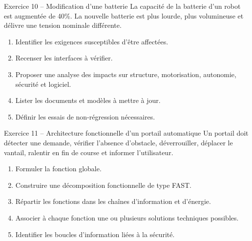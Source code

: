 \begin{TLExercise}{Exercice 10 -- Modification d'une batterie}
La capacité de la batterie d'un robot est augmentée de 40\%. La nouvelle batterie est plus lourde, plus volumineuse et délivre une tension nominale différente.
\begin{enumerate}
  \item Identifier les exigences susceptibles d'être affectées.
  \item Recenser les interfaces à vérifier.
  \item Proposer une analyse des impacts sur structure, motorisation, autonomie, sécurité et logiciel.
  \item Lister les documents et modèles à mettre à jour.
  \item Définir les essais de non-régression nécessaires.
\end{enumerate}
\end{TLExercise}

\begin{TLExercise}{Exercice 11 -- Architecture fonctionnelle d'un portail automatique}
Un portail doit détecter une demande, vérifier l'absence d'obstacle, déverrouiller, déplacer le vantail, ralentir en fin de course et informer l'utilisateur.
\begin{enumerate}
  \item Formuler la fonction globale.
  \item Construire une décomposition fonctionnelle de type FAST.
  \item Répartir les fonctions dans les chaînes d'information et d'énergie.
  \item Associer à chaque fonction une ou plusieurs solutions techniques possibles.
  \item Identifier les boucles d'information liées à la sécurité.
\end{enumerate}
\end{TLExercise}

